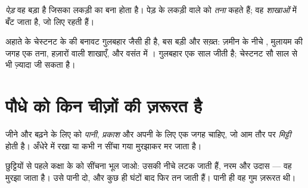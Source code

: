 \begin{definition}[पेड़]\label{def:g1:plants-around-us:tree}
\emph{पेड़} वह बड़ा  है जिसका  लकड़ी का बना होता
है। पेड़ के लकड़ी वाले  को \emph{तना} कहते हैं; वह
\emph{शाखाओं} में बँट जाता है, जो  लिए रहती
हैं।
\end{definition}

\begin{example}[चेस्टनट का पेड़]\label{ex:g1:plants-around-us:tree}
अहाते के चेस्टनट के  की बनावट गुलबहार जैसी ही है, बस बड़ी और
सख़्त: ज़मीन के नीचे , मुलायम  की जगह एक तना, हज़ारों
 वाली शाखाएँ, और वसंत में । गुलबहार एक साल जीती है;
चेस्टनट सौ साल से भी ज़्यादा जी सकता है।
\end{example}

\section{पौधे को किन चीज़ों की ज़रूरत है}

\begin{proposition}[पौधे की ज़रूरतें]\label{prop:g1:plants-around-us:needs}
जीने और बढ़ने के लिए  को \emph{पानी}, \emph{प्रकाश} और अपनी 
के लिए एक जगह चाहिए, जो आम तौर पर \emph{मिट्टी} होती
है। अँधेरे में रखा या कभी न सींचा गया  मुरझाकर मर जाता है।
\end{proposition}
\admitted

\begin{example}[भुला दिया गया पौधा]\label{ex:g1:plants-around-us:wilt}
छुट्टियों से पहले कक्षा के  को सींचना भूल जाओ: उसकी 
नीचे लटक जाती हैं, नरम और उदास --- वह मुरझा जाता है। उसे पानी दो, और
कुछ ही घंटों बाद  फिर तन जाती हैं। पानी ही वह गुम ज़रूरत थी।
\end{example}

